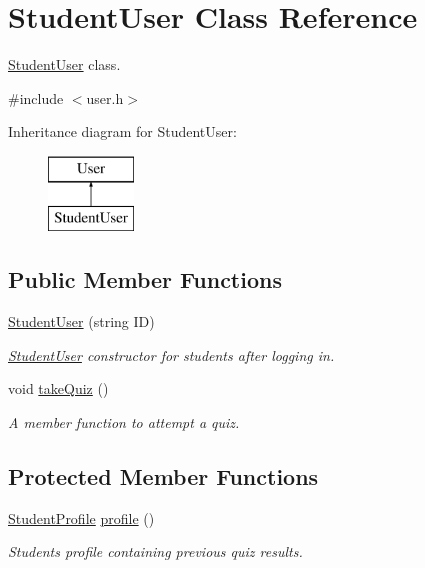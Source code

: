 \hypertarget{class_student_user}{}\section{Student\+User Class Reference}
\label{class_student_user}


\hyperlink{class_student_user}{Student\+User} class.  




{\ttfamily \#include $<$user.\+h$>$}

Inheritance diagram for Student\+User\+:\begin{figure}[H]
\begin{center}
\leavevmode
\includegraphics[height=2.000000cm]{class_student_user}
\end{center}
\end{figure}
\subsection*{Public Member Functions}
\begin{DoxyCompactItemize}
\item 
\hyperlink{class_student_user_ad518425f2cf0507128d638be6bb869d0}{Student\+User} (string I\+D)
\begin{DoxyCompactList}\small\item\em \hyperlink{class_student_user}{Student\+User} constructor for students after logging in. \end{DoxyCompactList}\item 
\hypertarget{class_student_user_a07d679b3034bf8c2d70dcda7b196fd6b}{}void \hyperlink{class_student_user_a07d679b3034bf8c2d70dcda7b196fd6b}{take\+Quiz} ()\label{class_student_user_a07d679b3034bf8c2d70dcda7b196fd6b}

\begin{DoxyCompactList}\small\item\em A member function to attempt a quiz. \end{DoxyCompactList}\end{DoxyCompactItemize}
\subsection*{Protected Member Functions}
\begin{DoxyCompactItemize}
\item 
\hypertarget{class_student_user_ace0179d78b516453d662b89d21438888}{}\hyperlink{class_student_profile}{Student\+Profile} \hyperlink{class_student_user_ace0179d78b516453d662b89d21438888}{profile} ()\label{class_student_user_ace0179d78b516453d662b89d21438888}

\begin{DoxyCompactList}\small\item\em Student\textquotesingle{}s profile containing previous quiz results. \end{DoxyCompactList}\end{DoxyCompactItemize}
